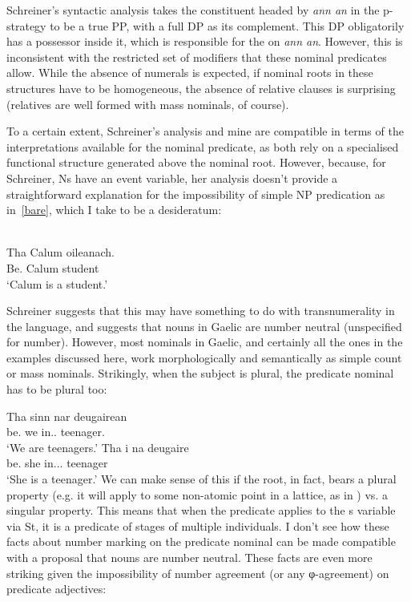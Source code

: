 \documentclass[output=paper]{langsci/langscibook}
\begin{document}
Schreiner's syntactic analysis takes the constituent headed by \emph{ann an} in
the p-strategy to be a true PP, with a full DP as its complement. This DP
obligatorily has a possessor inside it, which is responsible for the 
on \emph{ann an}. However, this is inconsistent with the restricted
set of modifiers that these nominal predicates allow. While the absence of
numerals is expected, if nominal roots in these structures have to be
homogeneous, the absence of relative clauses is surprising (relatives are well
formed with mass nominals, of course).

To a certain extent, Schreiner's  analysis and mine are compatible in terms of
the interpretations available for the nominal predicate, as both rely on a
specialised functional structure generated above the nominal root. However,
because, for Schreiner, Ns have an event variable, her analysis  doesn't
provide a straightforward explanation for the impossibility of simple NP
predication as in~\eqref{bare}, which I take to be a desideratum:

\ea {}\\
    \gll * Tha  Calum  oileanach.\\
         {} Be.\Prs{}  Calum student \\
\glt  {} \enquote*{Calum is a student.}\label{bare}
\z

Schreiner suggests that this may have something to do with transnumerality in
the language, and suggests that nouns in Gaelic are number neutral (unspecified
for number). However, most nominals in Gaelic, and certainly all the ones in
the examples discussed here, work morphologically and semantically as simple
count or mass nominals. Strikingly, when the subject is plural, the predicate
nominal has to be plural too:

\ea {} \label{teenagers}
\ea \gll  Tha sinn nar deugairean\\
be.\Prs{} we in.\Poss.\Fpl{} teenager.\Pl{}\\
\glt \enquote*{We are teenagers.}
\ex \gll Tha i na deugaire\\
be.\Prs{} she in.\Poss.\Tsg.\glossF{} teenager \\
\glt \enquote*{She is a teenager.}
\z \z
We can make sense of this if the root, in fact, bears a plural property (e.g.
it will apply to some non-atomic point in a lattice, as in \citealt{Link:1983}) vs.
a singular property. This means that when the predicate applies to the s
variable via St, it is a predicate of stages of multiple individuals. I don't
see how these facts about number marking on the predicate nominal can be made
compatible with a proposal that nouns are number neutral. These facts are even
more striking given the impossibility of number agreement (or any
φ-agreement) on predicate adjectives:
\end{document}
